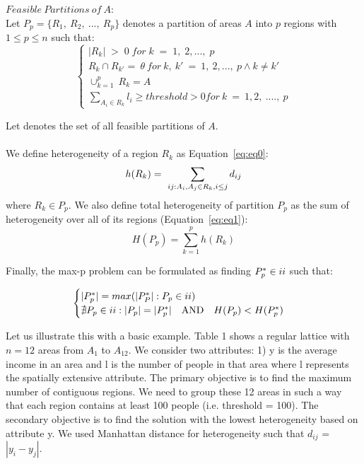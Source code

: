 \documentclass[conference]{IEEEtran}
\begin{document}
$Feasible\ Partitions\ of\ A:$\\
Let $P_p = \{R_1,\ R_2,\ ...,\ R_p\}$ denotes a partition of areas $A$ into $p$ regions with $1 \leq p \leq n$ such that:\\
\begin{equation}
\begin{cases}
|R_k|\; >\; 0\; for\; k\; =\;1,\; 2, ...,\;p \\
R_k \cap R_{k'}=\ \theta\ for\ k,\ k'\ =\ 1,\ 2, ...,\ p \wedge k \neq k' \\
\cup_{k=1}^p\ R_k = A\\
\sum_{A_i \in R_k} l_i \geq threshold > 0 for\ k\ =\ 1,2,\ ....,\ p
\end{cases}
\end{equation}

\newcommand{\RNum}[1]{\uppercase\expandafter{\romannumeral #1\relax}}
Let \RNum{2} denotes the set of all feasible partitions of $A$.\\
 \\

We define heterogeneity of a region $R_k$ as Equation~\ref{eq:eq0}:
\begin{equation}\label{eq:eq0}
h(R_k) =\ \sum_{ij:A_i,A_j\in R_k,i\leq j} d_{ij}\\
\end{equation}
where $R_k \in P_p$. We also define total heterogeneity of partition $P_p$ as the sum of heterogeneity over all of its regions (Equation~\ref{eq:eq1}):
\begin{equation}\label{eq:eq1}
H(P_p) =\sum_{k=1}^p h(R_k)
\end{equation}
 
Finally, the max-p problem can be formulated as finding $P_p^* \in \RNum{2}$ such that:

\begin{equation}
\begin{cases}
 |P_p^*| = max(|P_P^*|:P_p \in \RNum{2}) \\
\nexists P_p \in \RNum{2}:|P_p| = |P_p^*| \quad \text{AND}\quad H(P_p) < H(P_p^*) \\
\end{cases}
\end{equation}

Let us illustrate this with a basic example. Table 1 shows a regular lattice
with $n=12$ areas from $A_1$ to $A_{12}$. We consider
two attributes: 1) y is the average income in an area and l is the number of people
in that area where l represents the spatially extensive attribute. The primary
objective is to find the maximum number of contiguous regions. We need to group
these 12 areas in such a way that each region contains at least 100 people (i.e.
threshold = 100). The secondary objective is to find the solution with the
lowest heterogeneity based on attribute y. We used Manhattan distance for
heterogeneity such that $d_{ij}$ = $|y_i - y_j|$.
\end{document}
